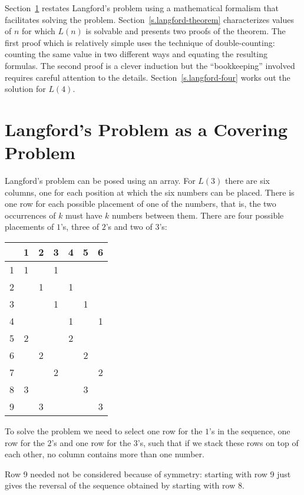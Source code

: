 \smallskip

Section~\ref{s.langford-covering} restates Langford's problem using a mathematical formalism that facilitates solving the problem. Section~\ref{s.langford-theorem} characterizes values of $n$ for which $L(n)$ is solvable and presents two proofs of the theorem. The first proof which is relatively simple uses the technique of double-counting: counting the same value in two different ways and equating the resulting formulas. The second proof is a clever induction but the ``bookkeeping'' involved requires careful attention to the details. Section~\ref{s.langford-four} works out the solution for $L(4)$.

\section{Langford's Problem as a Covering Problem}\label{s.langford-covering}
Langford's problem can be posed using an array. For $L(3)$ there are six columns, one for each position at which the six numbers can be placed. There is one row for each possible placement of one of the numbers, that is, the two occurrences of $k$ must have $k$ numbers between them. There are four possible placements of $1$'s, three of $2$'s and two of $3$'s:

\begin{center}
\addtolength{\tabcolsep}{4pt}
\begin{tabular}{|c||c|c|c|c|c|c|}
\hline
&1&2&3&4&5&6\\\hline\hline
1&1&&1&&&\\\hline
2&&1&&1&&\\\hline
3&&&1&&1&\\\hline
4&&&&1&&1\\\hline
5&2&&&2&&\\\hline
6&&2&&&2&\\\hline
7&&&2&&&2\\\hline
8&3&&&&3&\\\hline
9&&3&&&&3\\\hline
\end{tabular}
\end{center}
To solve the problem we need to select one row for the $1$'s in the sequence, one row for the $2$'s and one row for the $3$'s, such that if we stack these rows on top of each other, no column contains more than one number.

Row 9 needed not be considered because of symmetry: starting with row 9 just gives the reversal of the  sequence obtained by starting with row 8.

